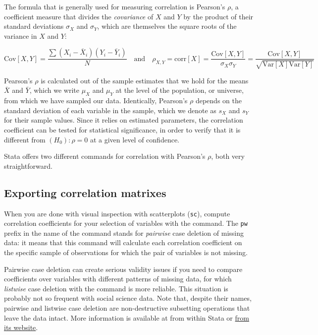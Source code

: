   The formula that is generally used for measuring correlation is Pearson's $\rho$, a coefficient measure that divides the \emph{covariance} of $X$ and $Y$ by the product of their standard deviations $\sigma_X$ and $\sigma_Y$, which are themselves the square roots of the variance in $X$ and $Y$:

  $$\text{Cov}[X,Y] = \frac{\sum{(X_i-\bar X_i)(Y_i-\bar Y_i)}}{N} \quad \text{and} \quad \rho_{X,Y} = \text{corr}[X] = \frac{\text{Cov}[X,Y]}{\sigma_X \sigma_Y} = \frac{\text{Cov}[X,Y]}{\sqrt{\text{Var}[X] \text{Var}[Y]}}$$

  Pearson's $\rho$ is calculated out of the sample estimates that we hold for the means $\bar X$ and $\bar Y$, which we write $\mu_X$ and $\mu_Y$ at the level of the population, or universe, from which we have sampled our data. Identically, Pearson's $\rho$ depends on the standard deviation of each variable in the sample, which we denote as $s_X$ and $s_Y$ for their sample values. Since it relies on estimated parameters, the correlation coefficient can be tested for statistical significance, in order to verify that it is different from $(H_0): \rho = 0$ at a given level of confidence.

  Stata offers two different commands for correlation with Pearson's $\rho$, both very straightforward. 

\subsection{Exporting correlation matrixes}%

When you are done with visual inspection with scatterplots (\texttt{sc}), compute correlation coefficients for your selection of variables with the  command. The \texttt{pw} prefix in the name of the command stands for \emph{pairwise} case deletion of missing data: it means that this command will calculate each correlation coefficient on the specific sample of observations for which the pair of variables is not missing.

\label{casewise}Pairwise case deletion can create serious validity issues if you need to compare coefficients over variables with different patterns of missing data, for which \emph{listwise} case deletion with the  command is more reliable. This situation is probably not so frequent with social science data. Note that, despite their names, pairwise and listwise case deletion are non-destructive subsetting operations that leave the data intact. More information is available at  from within Stata or \href{http://www.stata.com/help.cgi?correlate}{from its website}.

